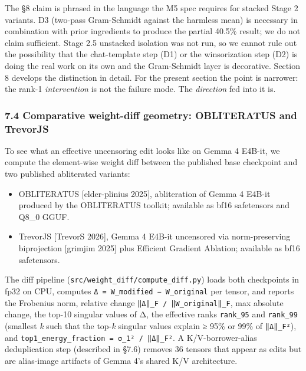 \documentclass[
  11pt,
]{article}
\providecommand{\tightlist}{%
  \setlength{\itemsep}{0pt}\setlength{\parskip}{0pt}}
\begin{document}
The §8 claim is phrased in the language the M5 spec requires for stacked
Stage 2 variants. D3 (two-pass Gram-Schmidt against the harmless mean)
is necessary in combination with prior ingredients to produce the
partial 40.5\% result; we do not claim sufficient. Stage 2.5 unstacked
isolation was not run, so we cannot rule out the possibility that the
chat-template step (D1) or the winsorization step (D2) is doing the real
work on its own and the Gram-Schmidt layer is decorative. Section 8
develops the distinction in detail. For the present section the point is
narrower: the rank-1 \emph{intervention} is not the failure mode. The
\emph{direction} fed into it is.

\subsubsection{7.4 Comparative weight-diff geometry: OBLITERATUS and
TrevorJS}\label{comparative-weight-diff-geometry-obliteratus-and-trevorjs}

To see what an effective uncensoring edit looks like on Gemma 4 E4B-it,
we compute the element-wise weight diff between the published base
checkpoint and two published abliterated variants:

\begin{itemize}
\tightlist
\item
  OBLITERATUS {[}elder-plinius 2025{]}, abliteration of Gemma 4 E4B-it
  produced by the OBLITERATUS toolkit; available as bf16 safetensors and
  Q8\_0 GGUF.
\item
  TrevorJS {[}TrevorS 2026{]}, Gemma 4 E4B-it uncensored via
  norm-preserving biprojection {[}grimjim 2025{]} plus Efficient
  Gradient Ablation; available as bf16 safetensors.
\end{itemize}

The diff pipeline (\texttt{src/weight\_diff/compute\_diff.py}) loads
both checkpoints in fp32 on CPU, computes
\texttt{Δ\ =\ W\_modified\ −\ W\_original} per tensor, and reports the
Frobenius norm, relative change \texttt{‖Δ‖\_F\ /\ ‖W\_original‖\_F},
max absolute change, the top-10 singular values of Δ, the effective
ranks \texttt{rank\_95} and \texttt{rank\_99} (smallest \emph{k} such
that the top-\emph{k} singular values explain ≥ 95\% or 99\% of
\texttt{‖Δ‖\_F²}), and
\texttt{top1\_energy\_fraction\ =\ σ\_1²\ /\ ‖Δ‖\_F²}. A
K/V-borrower-alias deduplication step (described in §7.6) removes 36
tensors that appear as edits but are alias-image artifacts of Gemma 4's
shared K/V architecture.
\end{document}
